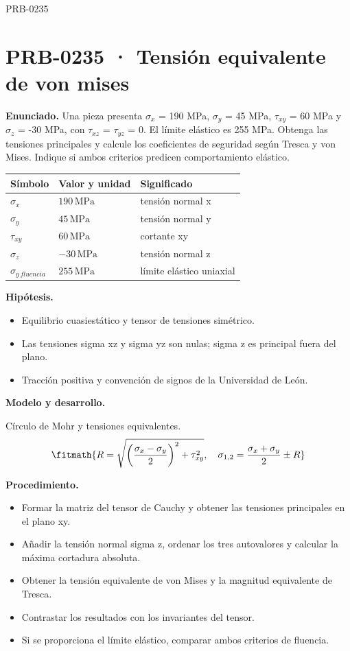 \begin{studiumworked}{PRB-0235}

\section{PRB-0235 · Tensión equivalente de von mises}

\textbf{Enunciado.} Una pieza presenta $\sigma_x$ = 190 MPa, $\sigma_y$ = 45 MPa, $\tau_{xy}$ = 60 MPa y $\sigma_z$ = -30 MPa, con $\tau_{xz}$ = $\tau_{yz}$ = 0. El límite elástico es 255 MPa. Obtenga las tensiones principales y calcule los coeficientes de seguridad según Tresca y von Mises. Indique si ambos criterios predicen comportamiento elástico.

\par\medskip\noindent\begin{tabular}{@{}p{.18\linewidth}p{.26\linewidth}p{.48\linewidth}@{}}
\toprule Símbolo & Valor y unidad & Significado\\\midrule
$\sigma_{x}$ & $190\,\mathrm{MPa}$ & tensión normal x\\
$\sigma_{y}$ & $45\,\mathrm{MPa}$ & tensión normal y\\
$\tau_{xy}$ & $60\,\mathrm{MPa}$ & cortante xy\\
$\sigma_{z}$ & $-30\,\mathrm{MPa}$ & tensión normal z\\
$\sigma_{y\,fluencia}$ & $255\,\mathrm{MPa}$ & límite elástico uniaxial\\
\bottomrule\end{tabular}\par\medskip

\textbf{Hipótesis.}\begin{itemize}\item Equilibrio cuasiestático y tensor de tensiones simétrico.
\item Las tensiones sigma xz y sigma yz son nulas; sigma z es principal fuera del plano.
\item Tracción positiva y convención de signos de la Universidad de León.\end{itemize}

\textbf{Modelo y desarrollo.}

Círculo de Mohr y tensiones equivalentes.\[\fitmath{R=\sqrt{\left(\frac{\sigma_x-\sigma_y}{2}\right)^2+\tau_{xy}^{2}},\quad\sigma_{1,2}=\frac{\sigma_x+\sigma_y}{2}\pm R}\]

\textbf{Procedimiento.}\begin{itemize}\item Formar la matriz del tensor de Cauchy y obtener las tensiones principales en el plano xy.
\item Añadir la tensión normal sigma z, ordenar los tres autovalores y calcular la máxima cortadura absoluta.
\item Obtener la tensión equivalente de von Mises y la magnitud equivalente de Tresca.
\item Contrastar los resultados con los invariantes del tensor.
\item Si se proporciona el límite elástico, comparar ambos criterios de fluencia.\end{itemize}


\end{studiumworked}
